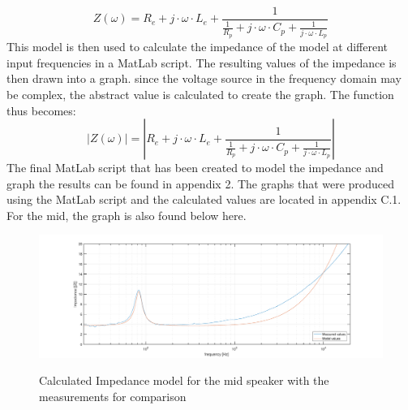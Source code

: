 \documentclass{article}
\newcommand\abs[1]{\left|#1\right|}
\begin{document}
$$Z(\omega) = R_e + j \cdot \omega \cdot L_e + \frac{1}{ \frac{1}{R_p} + j \cdot \omega \cdot C_p + \frac{1}{j \cdot \omega \cdot L_p} }$$
\newline
This model is then used to calculate the impedance of the model at different input frequencies in a MatLab script. The resulting values of the impedance is then drawn into a graph. since the voltage source in the frequency domain may be complex, the abstract value is calculated to create the graph. The function thus becomes:
\newline
$$\abs{Z(\omega)} = \abs{R_e + j \cdot \omega \cdot L_e + \frac{1}{ \frac{1}{R_p} + j \cdot \omega \cdot C_p + \frac{1}{j \cdot \omega \cdot L_p} }}$$
\newline
The final MatLab script that has been created to model the impedance and graph the results can be found in appendix 2.
\newline
The graphs that were produced using the MatLab script and the calculated values are located in appendix C.1. For the mid, the graph is also found below here.

\begin{figure}[H]
  \centering
  \includegraphics[height=0.2\paperheight]{Figures/Mid_Impedance_Model_Calculated.pdf}%
  \label{fig:Mid_Impedance_Model_Calculated_inText}
  \caption{Calculated Impedance model for the mid speaker with the measurements for comparison}
\end{figure}
\end{document}
